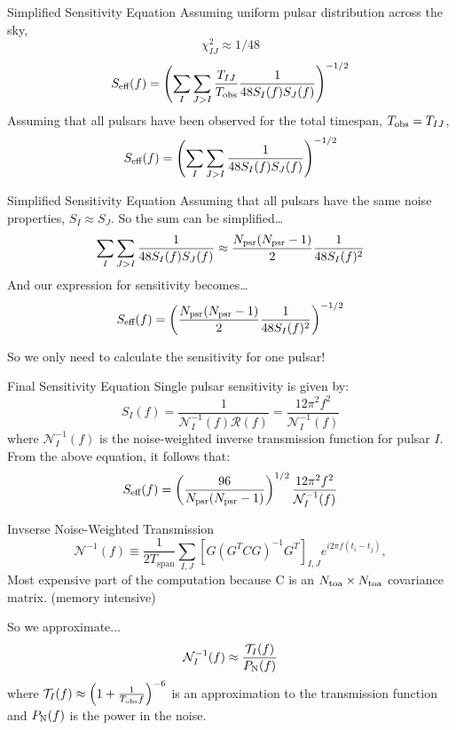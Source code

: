 \documentclass{beamer}
\begin{document}
\begin{frame}{Simplified Sensitivity Equation}
    Assuming uniform pulsar distribution across the sky,
    \[
    \chi_{IJ}^2 \approx 1/48
    \]
    \[
    S_{\text{eff}}(f) = \left( \sum_I \sum_{J > I} \frac{T_{IJ}}{T_{\text{obs}}} \frac{1}{48 \space S_I(f) S_J(f)} \right)^{-1/2}
    \]
    \pause
    Assuming that all pulsars have been observed for the total timespan, $T_{\rm obs}=T_{IJ}$,
    \[
    S_{\text{eff}}(f) = \left( \sum_I \sum_{J > I}\frac{1}{48 \space S_I(f) S_J(f)}\right)^{-1/2}
    \]
\end{frame}

\begin{frame}{Simplified Sensitivity Equation}
    Assuming that all pulsars have the same noise properties, $S_I\approx S_J$.
    So the sum can be simplified\ldots
    \[
    \sum_I \sum_{J > I} \frac{1}{48 \space S_I(f) S_J(f)} \approx \frac{N_{\rm psr}(N_{\rm psr}-1)}{2} \frac{1}{48 \space S_I(f)^2}
    \]
    And our expression for sensitivity becomes\ldots
    \[
    S_{\text{eff}}(f) = \left( \frac{N_{\rm psr}(N_{\rm psr}-1)}{2}\frac{1}{48 \space S_I(f)^2} \right)^{-1/2}
    \]

    So we only need to calculate the sensitivity for one pulsar!

\end{frame}


\begin{frame}{Final Sensitivity Equation}
    Single pulsar sensitivity is given by:
    \[
        S_{I}(f) = \frac{1}{\mathcal{N}_I^{-1}(f)\mathcal{R}(f)} = \frac{12\pi^2f^2}{\mathcal{N}_I^{-1}(f)}
        \]
        where $\mathcal{N}_I^{-1}(f)$ is the noise-weighted inverse transmission function for pulsar $I$.
    \pause
    \newline
    From the above equation, it follows that:
    \[
    S_{\text{eff}}(f) = \left(\frac{96}{N_{\rm psr}(N_{\rm psr}-1)}\right)^{1/2} \frac{12\pi^2f^2}{\mathcal{N}^{-1}_I(f)}
    \]
\end{frame}

\begin{frame}{Invserse Noise-Weighted Transmission}
    \[
    \mathcal{N}^{-1}(f) \equiv \frac{1}{2 T_{\text{span}}} \sum_{I,J} \left[ G \left( G^T C G \right)^{-1} G^T \right]_{I,J} e^{i 2 \pi f \left(t_i - t_j\right)},
    \]
    Most expensive part of the computation because C is an $N_{\rm toa} \times N_{\rm toa}$ covariance matrix.
    (memory intensive)
    \pause
    \newline

    So we approximate...
    \[
    \mathcal{N}^{-1}_I(f) \approx \frac{\mathcal{T}_I(f)}{P_{\rm N}(f)}
    \]
    where $\mathcal{T}_I(f) \approx \left(1 + \frac{1}{T_{\rm obs}f}\right)^{-6}$ is an approximation to the transmission function and $P_{\rm N}(f)$ is the power in the noise.
\end{frame}
\end{document}
